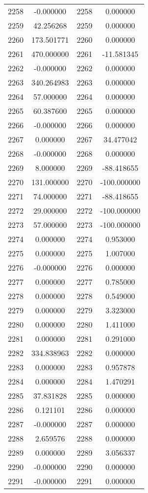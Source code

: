 \documentclass[12pt]{article}
\begin{document}
\begin{longtable}{@{}cccc@{}}
2258 & -0.000000 & 2258 & 0.000000 \\
2259 & 42.256268 & 2259 & 0.000000 \\
2260 & 173.501771 & 2260 & 0.000000 \\
2261 & 470.000000 & 2261 & -11.581345 \\
2262 & -0.000000 & 2262 & 0.000000 \\
2263 & 340.264983 & 2263 & 0.000000 \\
2264 & 57.000000 & 2264 & 0.000000 \\
2265 & 60.387600 & 2265 & 0.000000 \\
2266 & -0.000000 & 2266 & 0.000000 \\
2267 & 0.000000 & 2267 & 34.477042 \\
2268 & -0.000000 & 2268 & 0.000000 \\
2269 & 8.000000 & 2269 & -88.418655 \\
2270 & 131.000000 & 2270 & -100.000000 \\
2271 & 74.000000 & 2271 & -88.418655 \\
2272 & 29.000000 & 2272 & -100.000000 \\
2273 & 57.000000 & 2273 & -100.000000 \\
2274 & 0.000000 & 2274 & 0.953000 \\
2275 & 0.000000 & 2275 & 1.007000 \\
2276 & -0.000000 & 2276 & 0.000000 \\
2277 & 0.000000 & 2277 & 0.785000 \\
2278 & 0.000000 & 2278 & 0.549000 \\
2279 & 0.000000 & 2279 & 3.323000 \\
2280 & 0.000000 & 2280 & 1.411000 \\
2281 & 0.000000 & 2281 & 0.291000 \\
2282 & 334.838963 & 2282 & 0.000000 \\
2283 & 0.000000 & 2283 & 0.957878 \\
2284 & 0.000000 & 2284 & 1.470291 \\
2285 & 37.831828 & 2285 & 0.000000 \\
2286 & 0.121101 & 2286 & 0.000000 \\
2287 & -0.000000 & 2287 & 0.000000 \\
2288 & 2.659576 & 2288 & 0.000000 \\
2289 & 0.000000 & 2289 & 3.056337 \\
2290 & -0.000000 & 2290 & 0.000000 \\
2291 & -0.000000 & 2291 & 0.000000 \\

\end{longtable}
\end{document}
